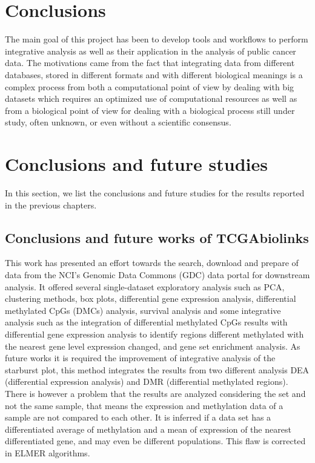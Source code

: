 \section{Conclusions}


The main goal of this project has been to develop tools and workflows to perform integrative analysis as well as their application in the analysis of public cancer data. The motivations came from the fact that integrating data from different databases, stored in different formats and with different biological meanings is a complex process from both a computational point of view by dealing with big datasets which requires an optimized use of computational resources as well as from a biological point of view for dealing with a biological process still under study, often unknown, or even without a scientific consensus.

\section{Conclusions and future studies}

In this section, we list the conclusions and future studies for the results reported in the previous chapters.

\subsection{Conclusions and future works of TCGAbiolinks}

This work has presented an effort towards the search, download and
prepare of data from the NCI's Genomic Data Commons (GDC) data portal for
downstream analysis. It offered several single-dataset
exploratory analysis such as PCA, clustering methods, box plots,
 differential gene expression analysis, differential methylated CpGs (DMCs) analysis,
 survival analysis and some integrative analysis
 such as the integration of differential methylated CpGs results with  differential gene expression analysis
 to identify regions different methylated with the nearest gene level expression changed, and
 gene set enrichment analysis.
As future works it is required the improvement of integrative analysis of the starburst plot, this method
integrates the results from two different analysis DEA (differential expression analysis) and DMR
(differential methylated regions).
There is however a problem that the results are analyzed considering the set and not the same sample,
that means the expression and methylation data of a sample are not compared to each other.
It is inferred if a data set has a differentiated average of methylation and a mean of
expression of the nearest differentiated gene, and may even be different populations.
This flaw is corrected in ELMER algorithms.

